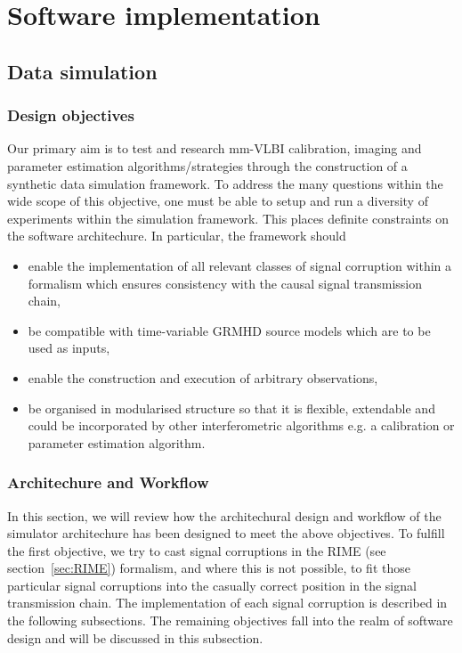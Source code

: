 \chapter{Software implementation}

\section{Data simulation}\label{sec:sim}
\subsection{Design objectives}
Our primary aim is to test and research mm-VLBI calibration, imaging and parameter estimation algorithms/strategies through the construction of a synthetic data simulation framework. To address the many questions within the wide scope of this objective, one must be able to setup and run a diversity of experiments within the simulation framework. This places definite constraints on the software architechure. In particular, the framework should 
\begin{itemize}
 \item enable the implementation of all relevant classes of signal corruption within a formalism which ensures consistency with the causal signal transmission chain,
 
 \item be compatible with time-variable GRMHD source models which are to be used as inputs,
 
 \item enable the construction and execution of arbitrary observations,
 
 \item be organised in modularised structure so that it is flexible, extendable and could be incorporated by other interferometric algorithms e.g. a calibration or parameter estimation algorithm.
\end{itemize}

\subsection{Architechure and Workflow}
In this section, we will review how the architechural design and workflow of the simulator architechure has been designed to meet the above objectives. To fulfill the first objective, we try to cast signal corruptions in the RIME (see section~\ref{sec:RIME}) formalism, and where this is not possible, to fit those particular signal corruptions into the casually correct position in the signal transmission chain. The implementation of each signal corruption is described in the following subsections. The remaining objectives fall into the realm of software design and will be discussed in this subsection.


